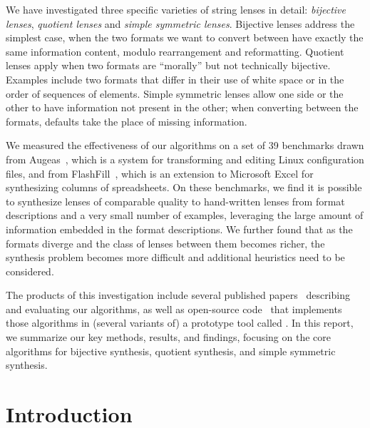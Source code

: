 \documentclass[12pt]{article}
\begin{document}
We have investigated three specific varieties of string lenses in detail: {\em
  bijective lenses}, {\em quotient
lenses} and {\em simple symmetric lenses}.  Bijective lenses address the
simplest case, when the two formats we want to convert between have exactly
the same information content, modulo rearrangement and reformatting.  
Quotient lenses apply when two
formats are ``morally'' but not technically bijective.  Examples include two
formats that differ in their use of white space or in the order of
sequences of elements.  Simple symmetric lenses allow one side or the other
to have 
information not present in the other; when converting between the
formats, defaults take the place of missing information. 

We measured the effectiveness of our
algorithms on a set of 39 benchmarks drawn from Augeas~\cite{augeas},
which is a system for transforming and editing Linux configuration
files, and from FlashFill~\cite{flashfill}, which is an extension to
Microsoft Excel for synthesizing columns of spreadsheets.
On these benchmarks, we find it is possible to synthesize lenses of
comparable quality to hand-written lenses from format descriptions and
a very small number of examples, leveraging 
the large amount of information embedded in the format descriptions. 
We further found that as the formats diverge and the class of lenses
between them becomes richer, the synthesis problem becomes more
difficult and additional heuristics need to be considered.

The products of this investigation include several published
papers~\cite{bijective-synthesis, quotient-synthesis, symmetric-synthesis}
describing and evaluating our algorithms, as well as open-source 
code~\cite{BijectiveOptician,QuotientOptician,SymmetricOptician} that implements those algorithms in (several variants of) a
prototype tool called \Optician{}.  In this report,
we summarize our key methods, results, and findings, focusing
on the core algorithms for bijective synthesis, quotient synthesis, and
simple symmetric synthesis.



\section{Introduction}
\end{document}
